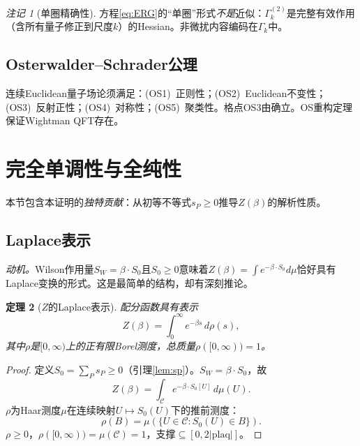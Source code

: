 \documentclass[12pt,a4paper]{article}
\theoremstyle{plain}
\newtheorem{theorem}{定理}[section]
\theoremstyle{definition}
\theoremstyle{remark}
\newtheorem{remark}[theorem]{注记}
\begin{document}
\begin{remark}[单圈精确性]\label{rem:oneloop}
方程\eqref{eq:ERG}的``单圈''形式\emph{不是}近似：$\Gamma_k^{(2)}$是完整有效作用（含所有量子修正到尺度$k$）的Hessian。非微扰内容编码在$\Gamma_k$中。
\end{remark}

\subsection{Osterwalder--Schrader公理}\label{sec:OSaxioms}

连续Euclidean量子场论须满足\cite{OsterwalderSchrader1973,OsterwalderSchrader1975}：(OS1)~正则性；(OS2)~Euclidean不变性；(OS3)~反射正性；(OS4)~对称性；(OS5)~聚类性。格点OS3由\cite{OsterwalderSeiler1978}确立。OS重构定理保证Wightman QFT存在。


\section{完全单调性与全纯性}\label{sec:analytic}

本节包含本证明的\emph{独特贡献}：从初等不等式$s_P\geq 0$推导$Z(\beta)$的解析性质。

\subsection{Laplace表示}\label{sec:laplace}

\textit{动机。}Wilson作用量$S_W=\beta\cdot S_0$且$S_0\geq 0$意味着$Z(\beta)=\int e^{-\beta\cdot S_0}d\mu$恰好具有Laplace变换的形式。这是最简单的结构，却有深刻推论。

\begin{theorem}[$Z$的Laplace表示]\label{thm:laplace}
配分函数具有表示
\begin{equation}\label{eq:laplace}
Z(\beta) = \int_0^\infty e^{-\beta s}\,d\rho(s),
\end{equation}
其中$\rho$是$[0,\infty)$上的正有限Borel测度，总质量$\rho([0,\infty))=1$。
\end{theorem}

\begin{proof}
定义$S_0=\sum_P s_P\geq 0$（引理\ref{lem:sp}）。$S_W=\beta\cdot S_0$，故
\begin{equation}\label{eq:Zfactor}
Z(\beta)=\int_{\mathcal{C}}e^{-\beta\cdot S_0[U]}\,d\mu(U).
\end{equation}
$\rho$为Haar测度$\mu$在连续映射$U\mapsto S_0(U)$下的推前测度：
\begin{equation}\label{eq:rho}
\rho(B) = \mu(\{U\in\mathcal{C}: S_0(U)\in B\}).
\end{equation}
$\rho\geq 0$，$\rho([0,\infty))=\mu(\mathcal{C})=1$，支撑$\subseteq[0,2|\mathrm{plaq}|]$。
\end{proof}
\end{document}
